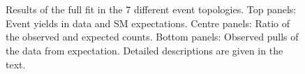 \begin{figure}[!h]
{  }\\
  ~ 
  \\
  \caption{\label{fig:full-fit} Results of the full fit in the 7 different event topologies.
  Top panels:  Event yields in data and SM expectations.
  Centre panels:  Ratio of the observed and expected counts.
  Bottom panels:  Observed pulls of the data from expectation.
  Detailed descriptions are given in the text.
	}
\end{figure}

